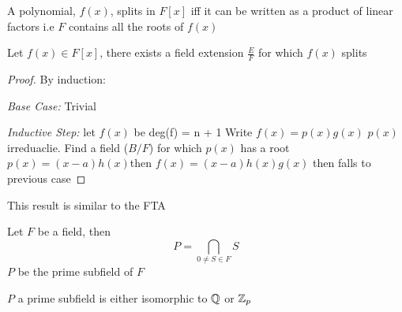
\begin{definition}[splits]
	\label{def:splits}
	A polynomial, \(f(x)\), splits in \(F[x]\) iff it can be written as a product of linear factors i.e \(F\) contains all the roots of \(f(x)\) 
\end{definition}

\begin{theorem}
	Let \(f(x) \in F[x]\), there exists a field extension \(\frac{E}{F}\)   for which \(f(x)\) splits
\end{theorem}
\begin{proof}
	By induction:
	
	\emph{Base Case:} Trivial
	
	\emph{Inductive Step:} let \(f(x)\) be deg(f) = n + 1
	Write \(f(x) = p(x)g(x)\) \(p(x)\) irreduaclie. Find a field (\(B/F\)) for which \(p(x)\) has a root \(p(x)=(x-a)h(x)\)then \(f(x)=(x-a)h(x)g(x)\) then falls to previous case 
\end{proof}

\begin{note}
	This result is similar to the FTA
\end{note}

\begin{definition}
	\label{def:prime subfield}
	Let \(F\) be a field, then
	\[
		P = \bigcap_{0 \neq S \in F} S
	\]
	\(P\) be the prime subfield of \(F\)  
\end{definition}
\begin{theorem}
	\(P\) a prime subfield is either isomorphic to \(\mathbb{Q}\) or \(\mathbb{Z}_p\)  
\end{theorem} 
